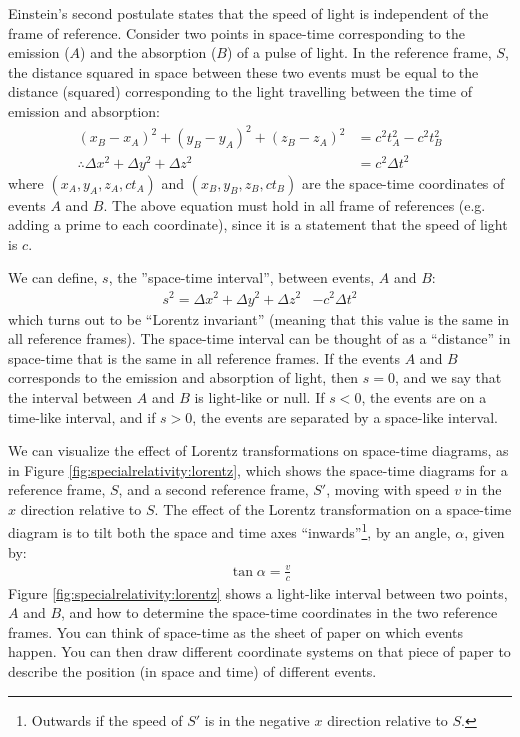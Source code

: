 Einstein's second postulate states that the speed of light is independent of the frame of reference. Consider two points in space-time corresponding to the emission ($A$) and the absorption ($B$) of a pulse of light. In the reference frame, $S$, the distance squared in space between these two events must be equal to the distance (squared) corresponding to the light travelling between the time of emission and absorption:
\begin{align*}
(x_B-x_A)^2+(y_B-y_A)^2+(z_B-z_A)^2&= c^2t_A^2-c^2t_B^2\\
\therefore \Delta x^2 + \Delta y^2 +\Delta z^2&=c^2\Delta t^2
\end{align*}
where $(x_A,y_A,z_A,ct_A)$ and $(x_B,y_B,z_B,ct_B)$ are the space-time coordinates of events $A$ and $B$. The above equation must hold in all frame of references (e.g. adding a prime to each coordinate), since it is a statement that the speed of light is $c$.

We can define, $s$, the ''space-time interval'', between events, $A$ and $B$:
\begin{align*}
s^2 = \Delta x^2 + \Delta y^2 +\Delta z^2&-c^2\Delta t^2
\end{align*}
which turns out to be ``Lorentz invariant'' (meaning that this value is the same in all reference frames). The space-time interval can be thought of as a ``distance'' in space-time that is the same in all reference frames. If the events $A$ and $B$ corresponds to the emission and absorption of light, then $s=0$, and we say that the interval between $A$ and $B$ is light-like or null. If $s<0$, the events are on a time-like interval, and if $s>0$, the events are separated by a space-like interval.

We can visualize the effect of Lorentz transformations on space-time diagrams, as in Figure \ref{fig:specialrelativity:lorentz}, which shows the space-time diagrams for a reference frame, $S$, and a second reference frame, $S'$, moving with speed $v$ in the $x$ direction relative to $S$.
The effect of the Lorentz transformation on a space-time diagram is to tilt both the space and time axes ``inwards''\footnote{Outwards if the speed of $S'$ is in the negative $x$ direction relative to $S$.}, by an angle, $\alpha$, given by:
\begin{align*}
\tan\alpha = \frac{v}{c}
\end{align*}
Figure \ref{fig:specialrelativity:lorentz} shows a light-like interval between two points, $A$ and $B$, and how to determine the space-time coordinates in the two reference frames. You can think of space-time as the sheet of paper on which events happen. You can then draw different coordinate systems on that piece of paper to describe the position (in space and time) of different events.

